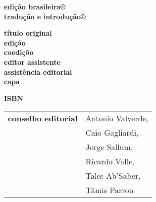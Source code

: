 \newcommand{\linha}[2]{\ifdef{#2}{\linhalayout{#1}{#2}}{}}

\begingroup\tiny
\parindent=0cm
\thispagestyle{empty}

\textbf{edição brasileira©}\\
\textbf{tradução e introdução©}\\\medskip

\textbf{título original}\\

\textbf{edição}\\
\textbf{coedição}\\
\textbf{editor assistente}\\
\textbf{assistência editorial}\\
\textbf{capa}\\\medskip

\textbf{ISBN}\smallskip

\hspace{-5pt}\begin{tabular}{ll}
\textbf{conselho editorial} %
							& Antonio Valverde,  \\
							& Caio Gagliardi,    \\
							& Jorge Sallum,      \\
							& Ricardo Valle,     \\
							& Tales Ab'Saber,    \\
							& Tâmis Parron      
\end{tabular}
 

